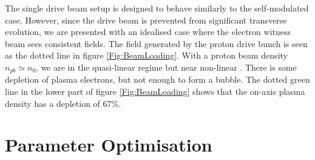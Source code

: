 \documentclass[aps,prstab,reprint,amsmath,amssymb,groupedaddress]{revtex4-1}
\begin{document}

The single drive beam setup is designed to behave similarly to the self-modulated case. However, since the drive beam is
prevented from significant transverse evolution, we are presented with an idealised case where the electron witness beam
sees consistent fields. The field generated by the proton drive bunch is seen as the dotted line in figure
\ref{Fig:BeamLoading}. With a proton beam density $n_{pb} \simeq n_{0}$, we are in the quasi-linear regime but near
non-linear \cite{rosenzweig:2010}. There is some depletion of plasma electrons, but not enough to form a bubble. The
dotted green line in the lower part of figure \ref{Fig:BeamLoading} shows that the on-axis plasma density has a
depletion of $67\%$.












\section[\label{S:PO}]{Parameter Optimisation}
\end{document}
